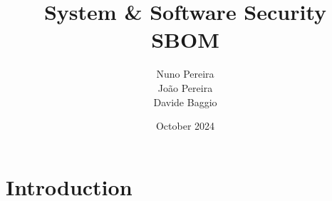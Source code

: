 \documentclass{article}
\title{System \& Software Security \\ SBOM}
\author{Nuno Pereira \\ João Pereira \\ Davide Baggio}
\date{October 2024}
\begin{document}
\maketitle

\section{Introduction}
\end{document}
